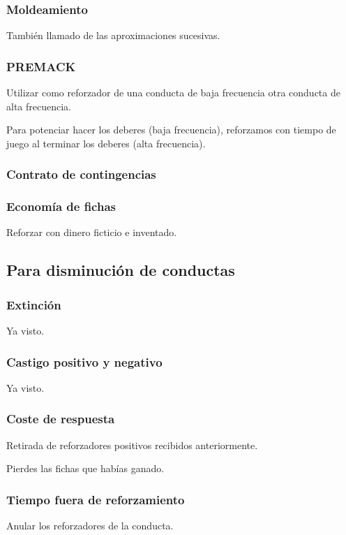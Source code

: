 \documentclass[palatino,nochap]{apuntesURJC}
\begin{document}
\subsubsection{Moldeamiento}
También llamado de las aproximaciones sucesivas.
\subsubsection{PREMACK}
Utilizar como reforzador de una conducta de baja frecuencia otra conducta de alta frecuencia. 
\begin{example}
Para potenciar hacer los deberes (baja frecuencia), reforzamos con tiempo de juego al terminar los deberes (alta frecuencia).
\end{example}


\subsubsection{Contrato de contingencias}
\subsubsection{Economía de fichas}
Reforzar con dinero ficticio e inventado.

\subsection{Para disminución de conductas}
\subsubsection{Extinción}
Ya visto.
\subsubsection{Castigo positivo y negativo}
Ya visto.
\subsubsection{Coste de respuesta}
Retirada de reforzadores positivos recibidos anteriormente. 

\begin{example} Pierdes las fichas que habías ganado. \end{example}

\subsubsection{Tiempo fuera de reforzamiento}
Anular los reforzadores de la conducta.
\end{document}
